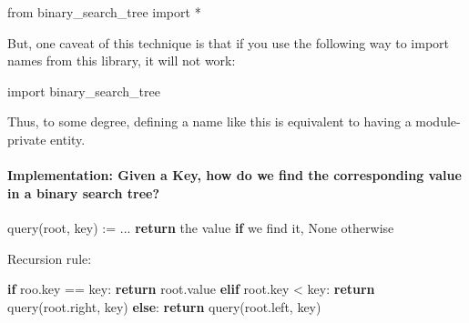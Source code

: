 \documentclass[11pt]{article}
\newenvironment{Shaded}{}{}
\newcommand{\NormalTok}[1]{{#1}}
\newcommand{\ImportTok}[1]{{#1}}
\newcommand{\VariableTok}[1]{\textcolor[rgb]{0.10,0.09,0.49}{{#1}}}
\newcommand{\ControlFlowTok}[1]{\textcolor[rgb]{0.00,0.44,0.13}{\textbf{{#1}}}}
\newcommand{\OperatorTok}[1]{\textcolor[rgb]{0.40,0.40,0.40}{{#1}}}
\begin{document}
\begin{Shaded}
\begin{Highlighting}[]
\ImportTok{from}\NormalTok{ binary_search_tree }\ImportTok{import} \OperatorTok{*}
\end{Highlighting}
\end{Shaded}

But, one caveat of this technique is that if you use the following way
to import names from this library, it will not work:

\begin{Shaded}
\begin{Highlighting}[]
\ImportTok{import}\NormalTok{ binary_search_tree}
\end{Highlighting}
\end{Shaded}

Thus, to some degree, defining a name like this is equivalent to having
a module-private entity.

    \paragraph{Implementation: Given a Key, how do we find the corresponding
value in a binary search
tree?}\label{implementation-given-a-key-how-do-we-find-the-corresponding-value-in-a-binary-search-tree}

\begin{Shaded}
\begin{Highlighting}[]
\NormalTok{query(root, key) :}\OperatorTok{=}\NormalTok{ ... }\ControlFlowTok{return}\NormalTok{ the value }\ControlFlowTok{if}\NormalTok{ we find it, }\VariableTok{None}\NormalTok{ otherwise}
\end{Highlighting}
\end{Shaded}

Recursion rule:

\begin{Shaded}
\begin{Highlighting}[]
\ControlFlowTok{if}\NormalTok{ roo.key }\OperatorTok{==}\NormalTok{ key:}
    \ControlFlowTok{return}\NormalTok{ root.value}
\ControlFlowTok{elif}\NormalTok{ root.key }\OperatorTok{<}\NormalTok{ key:}
    \ControlFlowTok{return}\NormalTok{ query(root.right, key)}
\ControlFlowTok{else}\NormalTok{:}
    \ControlFlowTok{return}\NormalTok{ query(root.left, key)}
\end{Highlighting}
\end{Shaded}
\end{document}
